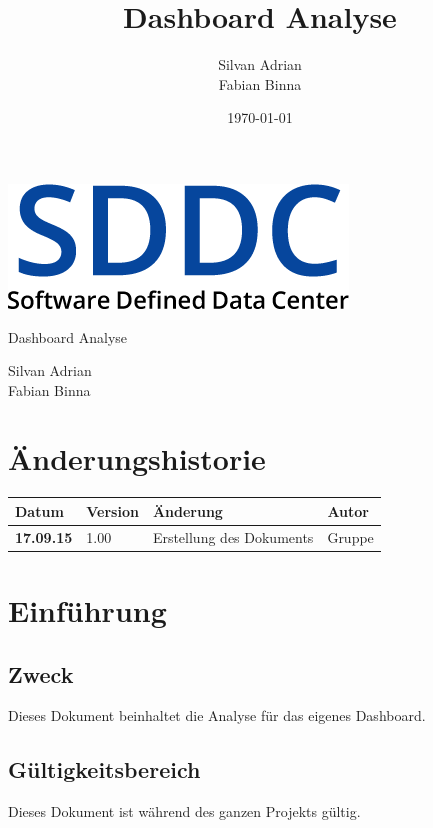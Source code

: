 \documentclass[11pt]{scrartcl}
\title{Dashboard Analyse}
\author{Silvan Adrian \\ Fabian Binna}
\date{\today{}}
\begin{document}
\def\arraystretch{1.5}
\begin{titlepage}
\begin{center}
\vspace{10em}
\includegraphics[scale=2]{SDDC}
\vspace{10em}
\end{center}
\begin{center}
\huge {Dashboard Analyse}
\end{center}
\begin{center}
\vspace{10em}
\LARGE {Silvan Adrian} \\
\LARGE {Fabian Binna}
\end{center}

\end{titlepage}

\newpage
\section{Änderungshistorie}
\begin{tabularx}{\linewidth}{l l X l}
\textbf{Datum} & \textbf{Version} & \textbf{Änderung}  & \textbf{Autor} \\
\hline
\textbf{17.09.15} & 1.00 & Erstellung des Dokuments & Gruppe \\

\end{tabularx}

\newpage
\tableofcontents
\newpage

\section{Einführung}
\subsection{Zweck}
Dieses Dokument beinhaltet die Analyse für das eigenes Dashboard.
\subsection{Gültigkeitsbereich}
Dieses Dokument ist während des ganzen Projekts gültig.
\end{document}
